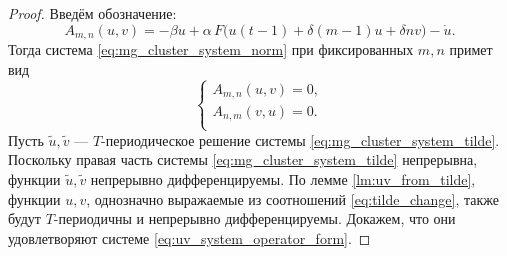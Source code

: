 \begin{proof}
	Введём обозначение:
	\begin{equation}
		\label{eq:operator_A_definition}
		A_{m, n}(u, v) = -\beta u + \alpha \, F\big(u(t - 1) + \delta (m - 1)u + \delta n v \big) - \dot{u}.
	\end{equation}
	Тогда система \eqref{eq:mg_cluster_system_norm} при фиксированных $m, n$ примет вид
	\begin{equation}
		\label{eq:uv_system_operator_form}
		\begin{cases}
			A_{m, n}(u, v) = 0,\\
			A_{n, m}(v, u) = 0.\\
		\end{cases} 
	\end{equation}
	Пусть $\tilde{u}, \tilde{v}$ --- $T$-периодическое решение системы \eqref{eq:mg_cluster_system_tilde}. Поскольку правая часть системы \eqref{eq:mg_cluster_system_tilde} непрерывна, функции $\tilde{u}, \tilde{v}$ непрерывно дифференцируемы. По лемме \ref{lm:uv_from_tilde}, функции $u, v$, однозначно выражаемые из соотношений \eqref{eq:tilde_change}, также будут $T$-периодичны и непрерывно дифференцируемы. Докажем, что они удовлетворяют системе \eqref{eq:uv_system_operator_form}.
	

\end{proof}
